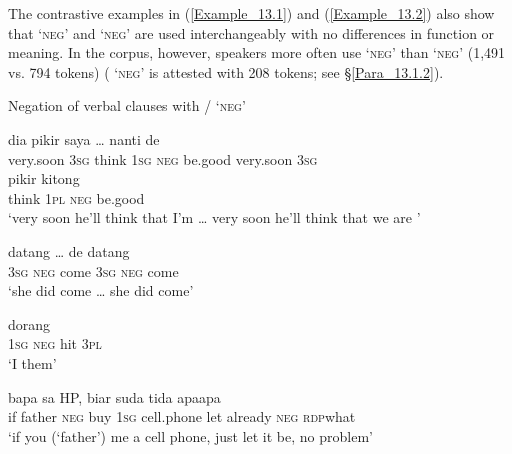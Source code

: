 The contrastive examples in (\ref{Example_13.1}) and (\ref{Example_13.2}) also show that  ‘\textsc{neg}’ and  ‘\textsc{neg}’ are used interchangeably with no differences in function or meaning. In the corpus, however, speakers more often use  ‘\textsc{neg}’ than  ‘\textsc{neg}’ (1,491 vs. 794 tokens) ( ‘\textsc{neg}’ is attested with 208 tokens; see §\ref{Para_13.1.2}).


\begin{styleExampleTitle}
Negation of verbal clauses with / ‘\textsc{neg}’
\end{styleExampleTitle}

\ea
\label{Example_13.1}
 {{dia}} {{pikir}} {saya} {} {} {\ldots} {nanti} {de}\\ %
 {very.soon}  {\textsc{3sg}}  {think}  \textsc{1sg}  \textsc{neg}  be.good {}   very.soon  \textsc{3sg}\\
\gll pikir  {kitong}  {}  {}\\
 think  {\textsc{1pl}}  {\textsc{neg}}  {be.good}\\
\glt 
‘very soon he’ll think that I’m {\ldots} very soon he’ll think that we are ’ \textstyleExampleSource{[080919-004-NP.0052-0053]}
\z

\ea
\label{Example_13.2}
 {} {datang} {\ldots} {de} {} {datang}\\ %
 \textsc{3sg}  \textsc{neg}  come  {}  \textsc{3sg}  \textsc{neg}  come\\
\glt 
‘she did  come {\ldots} she did  come’ \textstyleExampleSource{[081010-001-Cv.0204-0205]}
\z

\ea
\label{Example_13.3}
 {} {} {dorang}\\ %
 \textsc{1sg}  \textsc{neg}  hit  \textsc{3pl}\\
\glt 
‘I  them’ \textstyleExampleSource{[080917-010-CvEx.0048]}
\z

\ea
\label{Example_13.4}
 {bapa} {} {} {sa} {HP,} {biar} {suda} {tida} {apa{\Tilde}apa}\\ %
 if  father  \textsc{neg}  buy  \textsc{1sg}  cell.phone  let  already  \textsc{neg}  \textsc{rdp}{\Tilde}what\\
\glt 
‘if you (‘father’)  me a cell phone, just let it be, no problem’ \textstyleExampleSource{[080922-001a-CvPh.0461]}
\z

